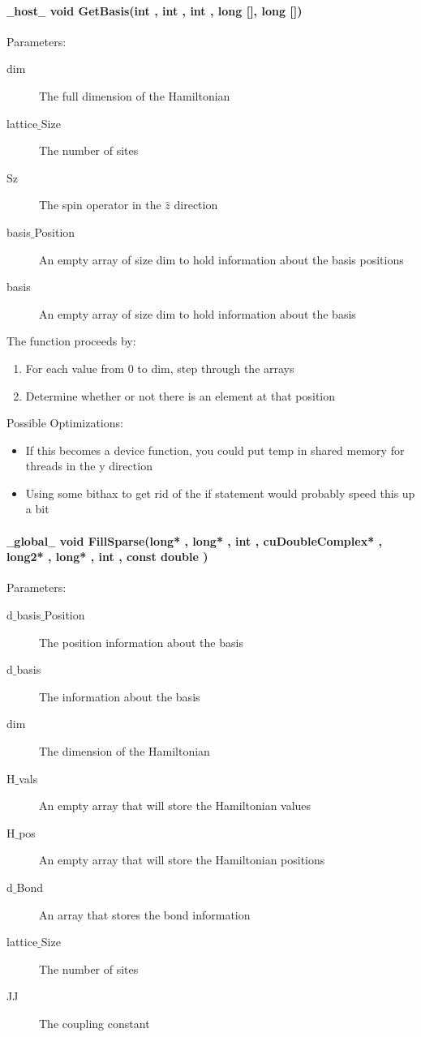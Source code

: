 \documentclass{article}
\begin{document}
\paragraph{$\_\_$host$\_\_$ void GetBasis(int , int , int , long [], long [])}

Parameters:
\begin{description}
\item[dim] The full dimension of the Hamiltonian
\item[lattice$\_$Size] The number of sites
\item[Sz] The spin operator in the $\hat{z}$ direction
\item[basis$\_$Position] An empty array of size dim to hold information about the basis positions
\item[basis] An empty array of size dim to hold information about the basis
\end{description}

The function proceeds by:
\begin{enumerate}
\item{For each value from 0 to dim, step through the arrays}
\item{Determine whether or not there is an element at that position}
\end{enumerate}

Possible Optimizations:
\begin{itemize}
\item{If this becomes a device function, you could put temp in shared memory for threads in the y direction}
\item{Using some bithax to get rid of the if statement would probably speed this up a bit}
\end{itemize}

\paragraph{$\_\_$global$\_\_$ void FillSparse(long* , long* , int , cuDoubleComplex* , long2* , long* , int , const double )}

Parameters:
\begin{description}
\item[d$\_$basis$\_$Position] The position information about the basis
\item[d$\_$basis] The information about the basis
\item[dim] The dimension of the Hamiltonian
\item[H$\_$vals] An empty array that will store the Hamiltonian values
\item[H$\_$pos] An empty array that will store the Hamiltonian positions
\item[d$\_$Bond] An array that stores the bond information
\item[lattice$\_$Size] The number of sites
\item[JJ] The coupling constant
\end{description}
\end{document}

